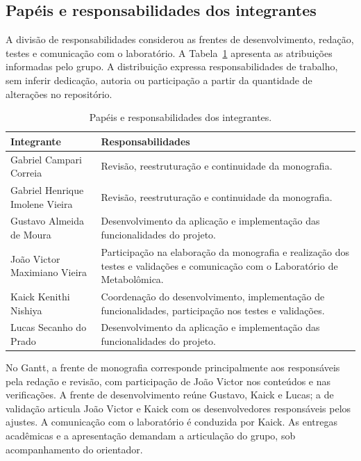 \subsection{Papéis e responsabilidades dos integrantes}

A divisão de responsabilidades considerou as frentes de desenvolvimento, redação, testes e comunicação com o laboratório. A Tabela~\ref{tab:4-responsabilidades} apresenta as atribuições informadas pelo grupo. A distribuição expressa responsabilidades de trabalho, sem inferir dedicação, autoria ou participação a partir da quantidade de alterações no repositório.

\begin{table}[htbp]
\centering
\caption{Papéis e responsabilidades dos integrantes.}
\label{tab:4-responsabilidades}
\small
\begin{tabularx}{\textwidth}{|p{}|X|}
\hline
\textbf{Integrante} & \textbf{Responsabilidades} \\ \hline
Gabriel Campari Correia & Revisão, reestruturação e continuidade da monografia. \\ \hline
Gabriel Henrique Imolene Vieira & Revisão, reestruturação e continuidade da monografia. \\ \hline
Gustavo Almeida de Moura & Desenvolvimento da aplicação e implementação das funcionalidades do projeto. \\ \hline
João Victor Maximiano Vieira & Participação na elaboração da monografia e realização dos testes e validações e comunicação com o Laboratório de Metabolômica. \\ \hline
Kaick Kenithi Nishiya & Coordenação do desenvolvimento, implementação de funcionalidades, participação nos testes e validações. \\ \hline
Lucas Secanho do Prado & Desenvolvimento da aplicação e implementação das funcionalidades do projeto. \\ \hline
\end{tabularx}
\par{}
\end{table}

No Gantt, a frente de monografia corresponde principalmente aos responsáveis pela redação e revisão, com participação de João Victor nos conteúdos e nas verificações. A frente de desenvolvimento reúne Gustavo, Kaick e Lucas; a de validação articula João Victor e Kaick com os desenvolvedores responsáveis pelos ajustes. A comunicação com o laboratório é conduzida por Kaick. As entregas acadêmicas e a apresentação demandam a articulação do grupo, sob acompanhamento do orientador.

